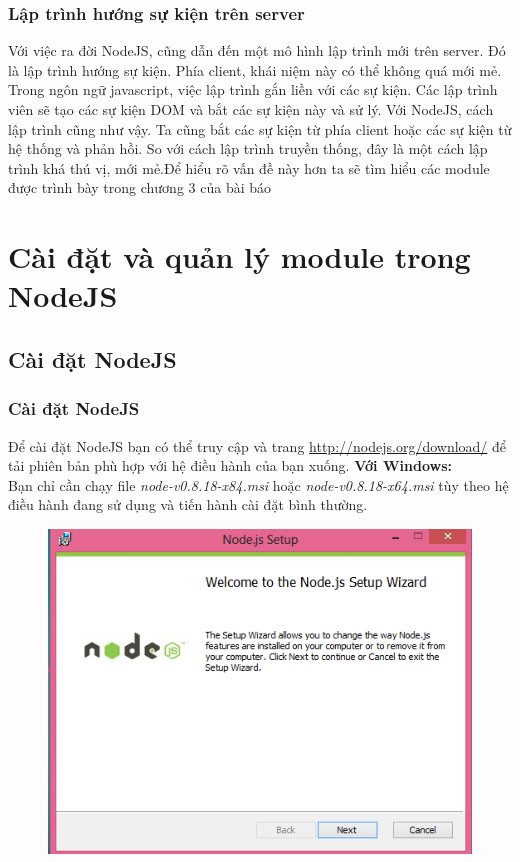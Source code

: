 \documentclass[a4paper,12pt]{report}
\begin{document}
\subsection{Lập trình hướng sự kiện trên server}
	Với việc ra đời NodeJS, cũng dẫn đến một mô hình lập trình mới trên server. Đó là lập trình hướng sự kiện. Phía client, khái niệm này có thể không quá mới mẻ. Trong ngôn ngữ javascript, việc lập trình gắn liền với các sự kiện. Các lập trình viên sẽ tạo các sự kiện DOM và bắt các sự kiện này và sử lý. Với NodeJS, cách lập trình cũng như vậy. Ta cũng bắt các sự kiện từ phía client hoặc các sự kiện từ hệ thống và phản hồi. So với cách lập trình truyền thống, đây là một cách lập trình khá thú vị, mới mẻ.Để hiểu rõ vấn đề này hơn ta sẽ tìm hiểu các module được trình bày trong chương 3 của bài báo
\chapter{Cài đặt và quản lý module trong NodeJS}
\section{Cài đặt NodeJS}
	\subsection{Cài đặt NodeJS}
   Để cài đặt NodeJS bạn có thể truy cập và trang \url{http://nodejs.org/download/} để tải phiên bản phù hợp với hệ điều hành của bạn xuống.
      \textbf{Với Windows:} \\
		Bạn chỉ cần chạy file \textit{node-v0.8.18-x84.msi} hoặc \textit{node-v0.8.18-x64.msi} tùy theo hệ điều hành đang sử dụng và tiến hành cài đặt bình thường.

	\begin{figure}[-h]
		\includegraphics[scale=0.7]{1.PNG}
	\end{figure}
	
\end{document}
